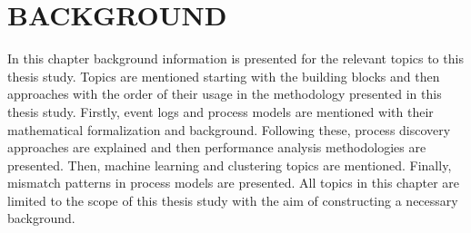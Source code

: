 \chapter{BACKGROUND}
\label{chp:background}
In this chapter background information is presented for the relevant topics to this thesis study. Topics are mentioned starting with the building blocks and then approaches with the order of their usage in the methodology presented in this thesis study. Firstly, event logs and process models are mentioned with their mathematical formalization and background. Following these, process discovery approaches are explained and then performance analysis methodologies are presented. Then, machine learning and clustering topics are mentioned. Finally, mismatch patterns in process models are presented. All topics in this chapter are limited to the scope of this thesis study with the aim of constructing a necessary background.

